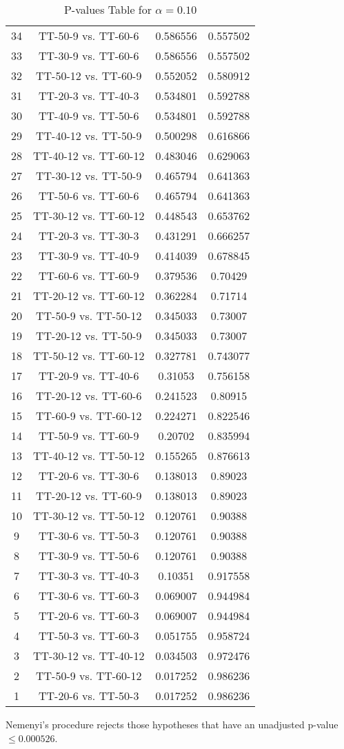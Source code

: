 \documentclass[a4paper,10pt]{article}
\begin{document}
\begin{landscape}
\begin{table}[!htp]
\begin{tabular}{cccc}
34&TT-50-9 vs. TT-60-6&0.586556&0.557502\\
33&TT-30-9 vs. TT-60-6&0.586556&0.557502\\
32&TT-50-12 vs. TT-60-9&0.552052&0.580912\\
31&TT-20-3 vs. TT-40-3&0.534801&0.592788\\
30&TT-40-9 vs. TT-50-6&0.534801&0.592788\\
29&TT-40-12 vs. TT-50-9&0.500298&0.616866\\
28&TT-40-12 vs. TT-60-12&0.483046&0.629063\\
27&TT-30-12 vs. TT-50-9&0.465794&0.641363\\
26&TT-50-6 vs. TT-60-6&0.465794&0.641363\\
25&TT-30-12 vs. TT-60-12&0.448543&0.653762\\
24&TT-20-3 vs. TT-30-3&0.431291&0.666257\\
23&TT-30-9 vs. TT-40-9&0.414039&0.678845\\
22&TT-60-6 vs. TT-60-9&0.379536&0.70429\\
21&TT-20-12 vs. TT-60-12&0.362284&0.71714\\
20&TT-50-9 vs. TT-50-12&0.345033&0.73007\\
19&TT-20-12 vs. TT-50-9&0.345033&0.73007\\
18&TT-50-12 vs. TT-60-12&0.327781&0.743077\\
17&TT-20-9 vs. TT-40-6&0.31053&0.756158\\
16&TT-20-12 vs. TT-60-6&0.241523&0.80915\\
15&TT-60-9 vs. TT-60-12&0.224271&0.822546\\
14&TT-50-9 vs. TT-60-9&0.20702&0.835994\\
13&TT-40-12 vs. TT-50-12&0.155265&0.876613\\
12&TT-20-6 vs. TT-30-6&0.138013&0.89023\\
11&TT-20-12 vs. TT-60-9&0.138013&0.89023\\
10&TT-30-12 vs. TT-50-12&0.120761&0.90388\\
9&TT-30-6 vs. TT-50-3&0.120761&0.90388\\
8&TT-30-9 vs. TT-50-6&0.120761&0.90388\\
7&TT-30-3 vs. TT-40-3&0.10351&0.917558\\
6&TT-30-6 vs. TT-60-3&0.069007&0.944984\\
5&TT-20-6 vs. TT-60-3&0.069007&0.944984\\
4&TT-50-3 vs. TT-60-3&0.051755&0.958724\\
3&TT-30-12 vs. TT-40-12&0.034503&0.972476\\
2&TT-50-9 vs. TT-60-12&0.017252&0.986236\\
1&TT-20-6 vs. TT-50-3&0.017252&0.986236\\
\hline
\end{tabular}
\caption{P-values Table for $\alpha=0.10$}
\end{table}Nemenyi's procedure rejects those hypotheses that have an unadjusted p-value $\le0.000526$.


\end{landscape}
\end{document}
